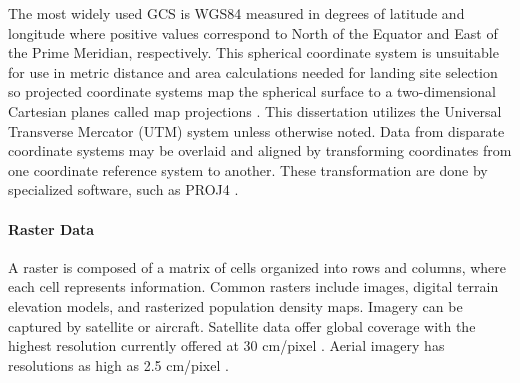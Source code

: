 The most widely used \acf{GCS} is WGS84 \cite{wgs84} measured in degrees of latitude  and longitude where positive values correspond to North of the Equator and East of the Prime Meridian, respectively. This spherical coordinate system is unsuitable for use in metric distance and area calculations needed for landing site selection so projected coordinate systems map the spherical surface to a two-dimensional Cartesian  planes called map projections \cite{GIS_demystified}.
This dissertation utilizes the Universal Transverse Mercator (UTM) system unless otherwise noted. 
Data from disparate coordinate systems may be overlaid and aligned by transforming coordinates from one coordinate reference system to another. These transformation are done by specialized software, such as PROJ4 \cite{proj_contributors_proj_2018}.


\paragraph{Raster Data}

A raster is composed of a matrix of cells organized into rows and columns, where each cell represents information. Common rasters include images, digital terrain elevation models, and rasterized population density maps. 
Imagery can be captured by satellite or aircraft.  
Satellite data offer global coverage with the highest resolution currently offered at 30 cm/pixel \cite{2041-210X.12973}.  Aerial imagery has resolutions as high as 2.5 cm/pixel \cite{SHAO2021126954, 2041-210X.12973}. 

